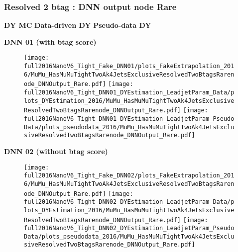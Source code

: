 \documentclass[9pt]{beamer}
\newcommand{\backupbegin}{
	\newcounter{finalframe}
	\setcounter{finalframe}{\value{framenumber}}
}
\newcommand{\backupend}{
	\setcounter{framenumber}{\value{finalframe}}
}
\begin{document}
\begin{frame}
	\frametitle{Resolved 2 btag : DNN output node Rare}
    \hspace{2cm} \textbf{DY MC} \hspace{1.9cm} \textbf{Data-driven DY} \hspace{1cm} \textbf{Pseudo-data DY}
    \begin{center}
        \textbf{DNN 01 (with btag score)}
    \end{center}
	\begin{figure}
		\texttt{[image: full2016NanoV6\_Tight\_Fake\_DNN01/plots\_FakeExtrapolation\_2016/MuMu\_HasMuMuTightTwoAk4JetsExclusiveResolvedTwoBtagsRarenode\_DNNOutput\_Rare.pdf]}
		\texttt{[image: full2016NanoV6\_Tight\_DNN01\_DYEstimation\_LeadjetParam\_Data/plots\_DYEstimation\_2016/MuMu\_HasMuMuTightTwoAk4JetsExclusiveResolvedTwoBtagsRarenode\_DNNOutput\_Rare.pdf]}
		\texttt{[image: full2016NanoV6\_Tight\_DNN01\_DYEstimation\_LeadjetParam\_PseudoData/plots\_pseudodata\_2016/MuMu\_HasMuMuTightTwoAk4JetsExclusiveResolvedTwoBtagsRarenode\_DNNOutput\_Rare.pdf]}
	\end{figure}
    \begin{center}
        \textbf{DNN 02 (without btag score)}
    \end{center}
	\begin{figure}
		\texttt{[image: full2016NanoV6\_Tight\_Fake\_DNN02/plots\_FakeExtrapolation\_2016/MuMu\_HasMuMuTightTwoAk4JetsExclusiveResolvedTwoBtagsRarenode\_DNNOutput\_Rare.pdf]}
		\texttt{[image: full2016NanoV6\_Tight\_DNN02\_DYEstimation\_LeadjetParam\_Data/plots\_DYEstimation\_2016/MuMu\_HasMuMuTightTwoAk4JetsExclusiveResolvedTwoBtagsRarenode\_DNNOutput\_Rare.pdf]}
		\texttt{[image: full2016NanoV6\_Tight\_DNN02\_DYEstimation\_LeadjetParam\_PseudoData/plots\_pseudodata\_2016/MuMu\_HasMuMuTightTwoAk4JetsExclusiveResolvedTwoBtagsRarenode\_DNNOutput\_Rare.pdf]}
	\end{figure}
\end{frame}



\backupbegin

\backupend
\end{document}
